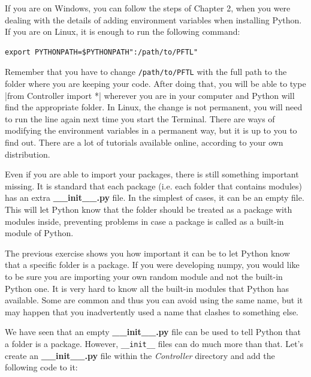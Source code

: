 If you are on Windows, you can follow the steps of Chapter 2, when you were dealing with the details of adding environment variables when
installing Python. If you are on Linux, it is enough to run the following command:

\begin{verbatim}
export PYTHONPATH=$PYTHONPATH":/path/to/PFTL"
\end{verbatim}

Remember that you have to change \texttt{/path/to/PFTL} with the full path to the folder where you are keeping your code. After doing that, you will be able to type |from Controller import *| wherever you are in your computer and Python will find the appropriate folder. In Linux, the change is not permanent, you will need to run the line again next time you start the Terminal. There are ways of modifying the environment variables in a permanent way, but it is up to you to find out. There are a lot of tutorials available online, according to your own distribution. 

Even if you are able to import your packages, there is still something important missing. It is standard that each package (i.e. each folder that contains modules) has an extra \textbf{\_\_init\_\_.py} file. In the simplest of cases, it can be an empty file. This will let Python know that the folder should be treated as a package with modules inside, preventing problems in case a package is called as a built-in module of Python. 


The previous exercise shows you how important it can be to let Python know that a specific folder is a package. If you were developing numpy, you would like to be sure you are importing your own random module and not the built-in Python one. It is very hard to know all the built-in modules that Python has available. Some are common and thus you can avoid using the same name, but it may happen that you inadvertently used a name that clashes to something else. 

We have seen that an empty \textbf{\_\_init\_\_.py} file can be used to tell Python that a folder is a package. However, \texttt{\_\_init\_\_} files can do much more than that. Let's create an \textbf{\_\_init\_\_.py} file within the \emph{Controller} directory and add the following code to it:

